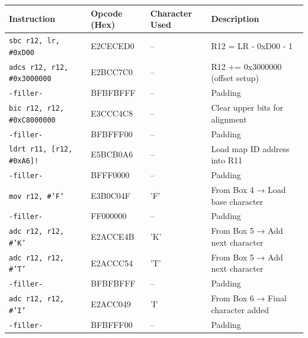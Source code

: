 \documentclass[a4paper]{usiinfbachelorproject}
\begin{document}
\begin{table}[htbp]
	\begin{tabular}{|l|l|l|p{6cm}|}
		\hline
		\textbf{Instruction}                & \textbf{Opcode (Hex)} & \textbf{Character Used} & \textbf{Description}               \\
		\hline
		\texttt{sbc r12, lr, \#0xD00}       & E2CECED0              & --                      & R12 = LR - 0xD00 - 1               \\
		\texttt{adcs r12, r12, \#0x3000000} & E2BCC7C0              & --                      & R12 += 0x3000000 (offset setup)    \\
		\texttt{-filler-}                   & BFBFBFFF              & --                      & Padding                            \\
		\texttt{bic r12, r12, \#0xC8000000} & E3CCC4C8              & --                      & Clear upper bits for alignment     \\
		\texttt{-filler-}                   & BFBFFF00              & --                      & Padding                            \\
		\texttt{ldrt r11, [r12, \#0xA6]!}   & E5BCB0A6              & --                      & Load map ID address into R11       \\
		\texttt{-filler-}                   & BFFF0000              & --                      & Padding                            \\
		\texttt{mov r12, \#'F'}             & E3B0C04F              & 'F'                     & From Box 4 → Load base character   \\
		\texttt{-filler-}                   & FF000000              & --                      & Padding                            \\
		\texttt{adc r12, r12, \#'K'}        & E2ACCE4B              & 'K'                     & From Box 5 → Add next character    \\
		\texttt{adc r12, r12, \#'T'}        & E2ACCC54              & 'T'                     & From Box 5 → Add next character    \\
		\texttt{-filler-}                   & BFBFBFFF              & --                      & Padding                            \\
		\texttt{adc r12, r12, \#'I'}        & E2ACC049              & 'I'                     & From Box 6 → Final character added \\
		\texttt{-filler-}                   & BFBFFF00              & --                      & Padding                            \\

\end{tabular}
\end{table}
\end{document}
